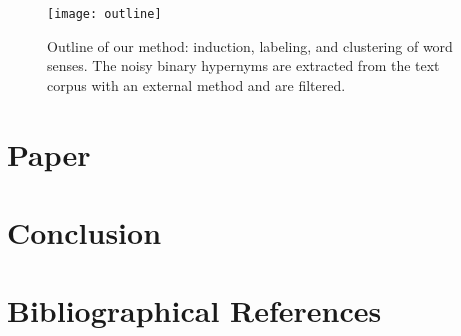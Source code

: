 \documentclass[10pt, a4paper]{article}
\begin{document}
\begin{figure*}[ht]
  \centering
  \texttt{[image: outline]}
  \caption{Outline of our method: induction, labeling, and clustering of word senses. The noisy binary hypernyms are extracted from the text corpus with an external method and are filtered. }
  \label{fig:outline}
\end{figure*}


\section{Paper}


\section{Conclusion}



\section{Bibliographical References}
\label{main:ref}





\end{document}
